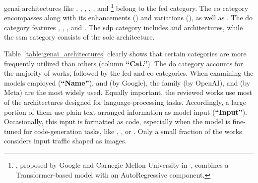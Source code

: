 %
\gls{genai} architectures
like , , , , , and %
\footnote{, proposed by Google and Carnegie Mellon University in~\cite{yang2019xlnet}, combines a Transformer-based model with an AutoRegressive component.}
belong to the \gls{fed}
category.
%
The 
\gls{eo} category encompasses  along with its enhancements (\eg {}) and variations (\eg {}), as well as . The 
\gls{do}
category features , , , and . The 
\gls{sdp}
category includes  and  architectures, while the 
\gls{ssm}
category consists of the sole  architecture.





Table~\ref{table:genai_architectures} clearly shows that certain categories are more frequently utilized than others (column \textbf{``Cat.''}).
The \gls{do} category accounts for the majority of works, followed by the \gls{fed} and \gls{eo} categories.
When examining the models employed (\textbf{``Name''}),  and  (by Google), the  family (by OpenAI), and  (by Meta) are the most widely used.
Equally important, the reviewed works use most of the architectures designed for language-processing tasks. Accordingly, a large portion of them use plain-text-arranged information as model input (\textbf{``Input''}).
Occasionally, this input is formatted as code, especially when the model is fine-tuned for code-generation tasks, like , , or .
Only a small fraction of the works~\cite{sivaroopan2023netdiffus,jiang2024netdiffusion,ho2022network} considers input traffic shaped as images.








